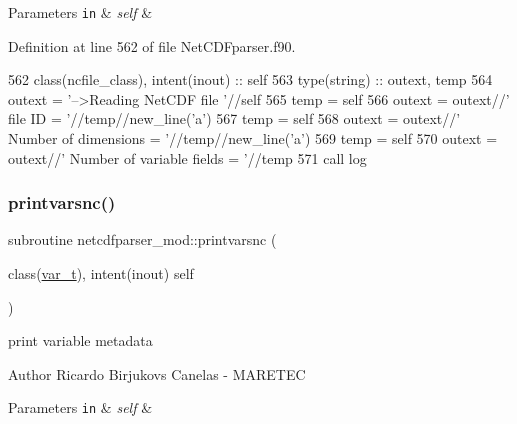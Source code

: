\begin{DoxyParams}[1]{Parameters}
\mbox{\tt in}  & {\em self} & \\
\hline
\end{DoxyParams}


Definition at line 562 of file Net\+C\+D\+Fparser.\+f90.


\begin{DoxyCode}
562     \textcolor{keywordtype}{class}(ncfile\_class), \textcolor{keywordtype}{intent(inout)} :: self
563     \textcolor{keywordtype}{type}(string) :: outext, temp
564     outext = \textcolor{stringliteral}{'-->Reading NetCDF file '}//self%
565     temp = self%
566     outext = outext//\textcolor{stringliteral}{'       file ID = '}//temp//new\_line(\textcolor{stringliteral}{'a'})
567     temp = self%
568     outext = outext//\textcolor{stringliteral}{'       Number of dimensions = '}//temp//new\_line(\textcolor{stringliteral}{'a'})
569     temp = self%
570     outext = outext//\textcolor{stringliteral}{'       Number of variable fields = '}//temp
571     \textcolor{keyword}{call }log%
\end{DoxyCode}
\mbox{\label{namespacenetcdfparser__mod_a6b57fa47d7bd796c75483216a51e5e04}} 
\subsubsection{\texorpdfstring{printvarsnc()}{printvarsnc()}}
{\footnotesize\ttfamily subroutine netcdfparser\+\_\+mod\+::printvarsnc (\begin{DoxyParamCaption}\item[{class(\mbox{\hyperlink{structnetcdfparser__mod_1_1var__t}{var\+\_\+t}}), intent(inout)}]{self }\end{DoxyParamCaption})\hspace{0.3cm}{\ttfamily [private]}}



print variable metadata 

\begin{DoxyAuthor}{Author}
Ricardo Birjukovs Canelas -\/ M\+A\+R\+E\+T\+EC 
\end{DoxyAuthor}

\begin{DoxyParams}[1]{Parameters}
\mbox{\tt in}  & {\em self} & \\
\hline
\end{DoxyParams}



